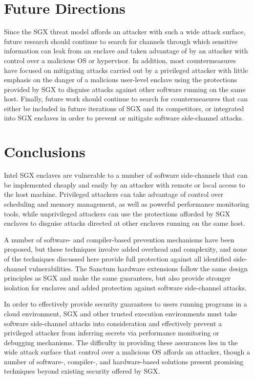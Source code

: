 \section{Future Directions}

Since the SGX threat model affords an attacker with such a wide attack surface, future research should continue to search for channels through which sensitive information can leak from an enclave and taken advantage of by an attacker with control over a malicious OS or hypervisor. In addition, most countermeasures have focused on mitigating attacks carried out by a privileged attacker with little emphasis on the danger of a malicious user-level enclave using the protections provided by SGX to disguise attacks against other software running on the same host. Finally, future work should continue to search for countermeasures that can either be included in future iterations of SGX and its competitors, or integrated into SGX enclaves in order to prevent or mitigate software side-channel attacks.

\section{Conclusions}

Intel SGX enclaves are vulnerable to a number of software side-channels that can be implemented cheaply and easily by an attacker with remote or local access to the host machine. Privileged attackers can take advantage of control over scheduling and memory management, as well as powerful performance monitoring tools, while unprivileged attackers can use the protections afforded by SGX enclaves to disguise attacks directed at other enclaves running on the same host. 

A number of software- and compiler-based prevention mechanisms have been proposed, but these techniques involve added overhead and complexity, and none of the techniques discussed here provide full protection against all identified side-channel vulnerabilities. The Sanctum hardware extensions follow the same design principles as SGX and make the same guarantees, but also provide stronger isolation for enclaves and added protection against software side-channel attacks. 

In order to effectively provide security guarantees to users running programs in a cloud environment, SGX and other trusted execution environments must take software side-channel attacks into consideration and effectively prevent a privileged attacker from inferring secrets via performance monitoring or debugging mechanisms. The difficulty in providing these assurances lies in the wide attack surface that control over a malicious OS affords an attacker, though a number of software-, compiler-, and hardware-based solutions present promising techniques beyond existing security offered by SGX. 
